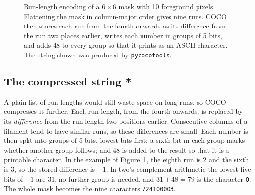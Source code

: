 \begin{figure}[t]
\centering
{}
\caption{Run-length encoding of a $6\times6$ mask with 10 foreground pixels. Flattening the mask in
column-major order gives nine runs. COCO then stores each run from the fourth onwards as its
difference from the run two places earlier, writes each number in groups of 5 bits, and adds 48 to
every group so that it prints as an ASCII character. The string shown was produced by
\texttt{pycocotools}. }
\label{fig:masks-rle}
\end{figure}

\subsection{The compressed string *}\label{sec:masks-rle-string}
A plain list of run lengths would still waste space on long runs, so COCO compresses it further.
Each run length, from the fourth onwards, is replaced by its \emph{difference} from the run length
two positions earlier. Consecutive columns of a filament tend to have similar runs, so these
differences are small. Each number is then split into groups of 5 bits, lowest bits first; a sixth
bit in each group marks whether another group follows; and 48 is added to the result so that it is
a printable character. In the example of Figure~\ref{fig:masks-rle}, the eighth run is 2 and the
sixth is 3, so the stored difference is $-1$. In two's complement arithmetic the lowest five bits
of $-1$ are 31, no further group is needed, and $31+48=79$ is the character \texttt{O}. The whole
mask becomes the nine characters \texttt{7241000O3}.

